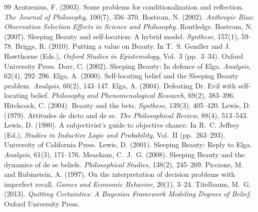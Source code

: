 \documentclass{situationist-preprint}
\begin{document}
\begin{thebibliography}{99}\small
{} Arntzenius, F. (2003). Some problems for conditionalization and reflection. \emph{The Journal of Philosophy}, 100(7), 356--370.
 Bostrom, N. (2002). \emph{Anthropic Bias: Observation Selection Effects in Science and Philosophy}. Routledge.
 Bostrom, N. (2007). Sleeping Beauty and self-location: A hybrid model. \emph{Synthese}, 157(1), 59--78.
 Briggs, R. (2010). Putting a value on Beauty. In T.~S. Gendler and J. Hawthorne (Eds.), \emph{Oxford Studies in Epistemology}, Vol.~3 (pp.~3--34). Oxford University Press.
 Dorr, C. (2002). Sleeping Beauty: In defence of Elga. \emph{Analysis}, 62(4), 292--296.
 Elga, A. (2000). Self-locating belief and the Sleeping Beauty problem. \emph{Analysis}, 60(2), 143--147.
 Elga, A. (2004). Defeating Dr. Evil with self-locating belief. \emph{Philosophy and Phenomenological Research}, 69(2), 383--396.
 Hitchcock, C. (2004). Beauty and the bets. \emph{Synthese}, 139(3), 405--420.
 Lewis, D. (1979). Attitudes de dicto and de se. \emph{The Philosophical Review}, 88(4), 513--543.
 Lewis, D. (1980). A subjectivist's guide to objective chance. In R.~C. Jeffrey (Ed.), \emph{Studies in Inductive Logic and Probability}, Vol.~II (pp.~263--293). University of California Press.
 Lewis, D. (2001). Sleeping Beauty: Reply to Elga. \emph{Analysis}, 61(3), 171--176.
 Meacham, C.~J.~G. (2008). Sleeping Beauty and the dynamics of de se beliefs. \emph{Philosophical Studies}, 138(2), 245--269.
 Piccione, M. and Rubinstein, A. (1997). On the interpretation of decision problems with imperfect recall. \emph{Games and Economic Behavior}, 20(1), 3--24.
 Titelbaum, M.~G. (2013). \emph{Quitting Certainties: A Bayesian Framework Modeling Degrees of Belief}. Oxford University Press.
\end{thebibliography}
\end{document}
